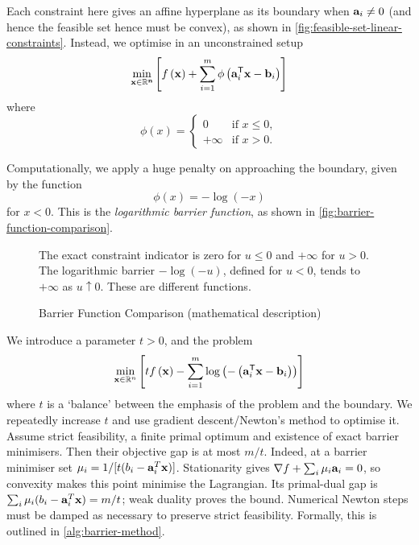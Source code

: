 \documentclass[11pt]{article}
\theoremstyle{definition}
\theoremstyle{remark}
\newcommand{\pqty}[1]{\left(#1\right)}
\newcommand{\bqty}[1]{\left[#1\right]}
\newcommand{\RR}{\mathbb{R}}
\newcommand{\transpose}{^{\mathsf{T}}}
\newcommand{\grad}{\nabla}
\newcommand{\plusinfty}{+\infty}
\begin{document}
Each constraint here gives an affine hyperplane as its boundary when \(\vb{a}_i\ne0\) (and hence the feasible set hence must be convex), as shown in \autoref{fig:feasible-set-linear-constraints}. Instead, we optimise in an unconstrained setup
\[
    \min_{\vb{x \in \RR^n}} \bqty{f\pqty{\vb{x}} + \sum_{i = 1}^{m} \phi\pqty{\vb{a}_i\transpose \vb{x} - \vb{b}_i}}
\]
where
\[
    \phi\pqty{x} = \begin{cases}
        0 & \text{if } x \leq 0, \\ \plusinfty & \text{if } x > 0.
    \end{cases}
\]

Computationally, we apply a huge penalty on approaching the boundary, given by the function
\[
    \phi\pqty{x} = - \log \pqty{-x}
\]
for \(x < 0\). This is the \emph{logarithmic barrier function}, as shown in \autoref{fig:barrier-function-comparison}.

\begin{figure}[ht!]\centering\begin{minipage}{0.94\linewidth}The exact constraint indicator is zero for \(u\le0\) and \(+\infty\) for \(u>0\). The logarithmic barrier \(-\log(-u)\), defined for \(u<0\), tends to \(+\infty\) as \(u\uparrow0\). These are different functions.\end{minipage}\caption{Barrier Function Comparison (mathematical description)}\label{fig:barrier-function-comparison}\end{figure}

We introduce a parameter \(t > 0\), and the problem
\[
    \min_{\vb{x} \in \RR^n} \bqty{t f\pqty{\vb{x}} - \sum_{i = 1}^{m} \log\pqty{- \pqty{\vb{a}_i\transpose \vb{x} - \vb{b}_i}}}
\]
where \(t\) is a `balance' between the emphasis of the problem and the boundary. We repeatedly increase \(t\) and use gradient descent/Newton's method to optimise it. Assume strict feasibility, a finite primal optimum and existence of exact barrier minimisers. Then their objective gap is at most \(m/t\). Indeed, at a barrier minimiser set \(\mu_i=1/[t(b_i-\vb{a}_i^T\vb{x})]\). Stationarity gives \(\grad f+\sum_i\mu_i\vb{a}_i=0\), so convexity makes this point minimise the Lagrangian. Its primal-dual gap is \(\sum_i\mu_i(b_i-\vb{a}_i^T\vb{x})=m/t\); weak duality proves the bound. Numerical Newton steps must be damped as necessary to preserve strict feasibility. Formally, this is outlined in \autoref{alg:barrier-method}.
\end{document}
